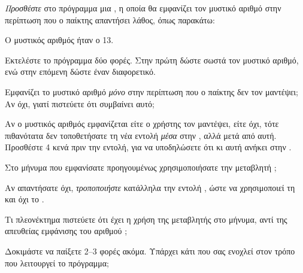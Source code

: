 \documentclass[a4paper,11pt,oneside]{book}
\begin{document}
\begin{step}
\label{step:secret-print}

\emph{Προσθέστε} στο πρόγραμμα μια , η οποία θα εμφανίζει τον μυστικό αριθμό στην περίπτωση που ο παίκτης απαντήσει λάθος, όπως παρακάτω:

\marginnote[16pt]{\iconcomputer}
\begin{pyterm}
Ο μυστικός αριθμός ήταν ο 13.
\end{pyterm}





Εκτελέστε το πρόγραμμα δύο φορές. Στην πρώτη δώστε σωστά τον μυστικό αριθμό, ενώ στην επόμενη δώστε έναν διαφορετικό.

Εμφανίζει το μυστικό αριθμό \emph{μόνο} στην περίπτωση που ο παίκτης δεν τον μαντέψει; Αν όχι, γιατί πιστεύετε ότι συμβαίνει αυτό;

\marginnote[14pt]{\icondiscuss}
\dottedline

\dottedline

\marginnote[16pt]{\iconcaution}
Αν ο μυστικός αριθμός εμφανίζεται είτε ο χρήστης τον μαντέψει, είτε όχι, τότε πιθανότατα δεν τοποθετήσατε τη νέα εντολή \emph{μέσα} στην , αλλά μετά από αυτή. Προσθέστε 4 κενά πριν την εντολή, για να υποδηλώσετε ότι κι αυτή ανήκει στην .
\end{step}

\begin{step}
Στο μήνυμα που εμφανίσατε προηγουμένως χρησιμοποιήσατε την μεταβλητή ;

\marginnote[14pt]{\icondiscuss}
\dottedline

Αν απαντήσατε όχι, \emph{τροποποιήστε} κατάλληλα την εντολή , ώστε να χρησιμοποιεί τη  και όχι το .

Τι πλεονέκτημα πιστεύετε ότι έχει η χρήση της μεταβλητής  στο μήνυμα, αντί της απευθείας εμφάνισης του αριθμού ;

\marginnote[14pt]{\icondiscuss}
\dottedline

Δοκιμάστε να παίξετε 2--3 φορές ακόμα. Υπάρχει κάτι που σας ενοχλεί στον τρόπο που λειτουργεί το πρόγραμμα;

\marginnote[14pt]{\icondiscuss}
\dottedline

\end{step}
\end{document}
